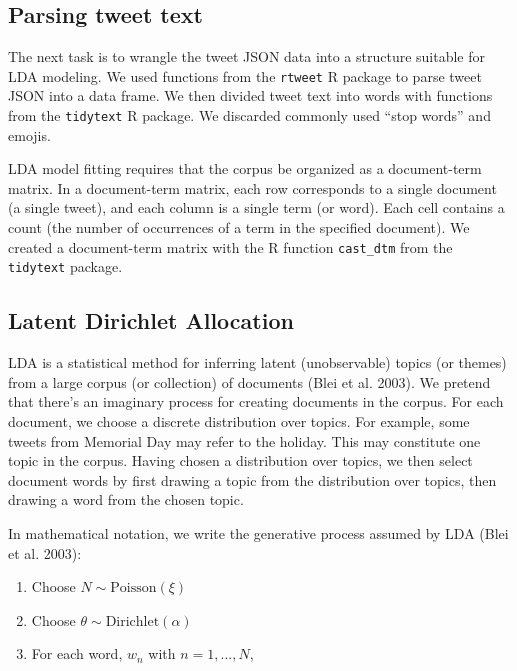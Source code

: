 \documentclass[
]{article}
\providecommand{\tightlist}{%
  \setlength{\itemsep}{0pt}\setlength{\parskip}{0pt}}
\begin{document}
\hypertarget{parsing-tweet-text}{%
\subsection{Parsing tweet text}\label{parsing-tweet-text}}

The next task is to wrangle the tweet JSON data into a structure suitable for LDA modeling.
We used functions from the \texttt{rtweet} R package to parse tweet JSON into a data frame.
We then divided tweet text into words with functions from the \texttt{tidytext} R package. We
discarded commonly used ``stop words'' and emojis.

LDA model fitting requires that the corpus be organized as a
document-term matrix. In a document-term matrix, each row corresponds to a single document (a single
tweet), and each column is a single term (or word). Each cell contains a
count (the number of
occurrences of a term in the specified document). We created a document-term matrix with the R function \texttt{cast\_dtm} from the \texttt{tidytext} package.

\hypertarget{latent-dirichlet-allocation}{%
\subsection{Latent Dirichlet Allocation}\label{latent-dirichlet-allocation}}

LDA is a statistical method for inferring latent (unobservable) topics (or themes)
from a large corpus (or collection) of documents (Blei et al. 2003).
We pretend that there's an imaginary process for creating documents in the corpus. For each document,
we choose a discrete distribution over topics. For example, some tweets from Memorial Day may
refer to the holiday. This may constitute one topic in the corpus.
Having chosen a distribution over topics, we then select document words by first
drawing a topic from the distribution over topics, then drawing a word from the
chosen topic.

In mathematical notation, we write the generative process assumed by LDA (Blei et al. 2003):

\begin{enumerate}
\def\labelenumi{\arabic{enumi}.}
\tightlist
\item
  Choose \(N \sim \text{Poisson}(\xi)\)\\
\item
  Choose \(\theta \sim \text{Dirichlet}(\alpha)\)\\
\item
  For each word, \(w_n\) with \(n = 1, ..., N\),
\end{enumerate}
\end{document}
